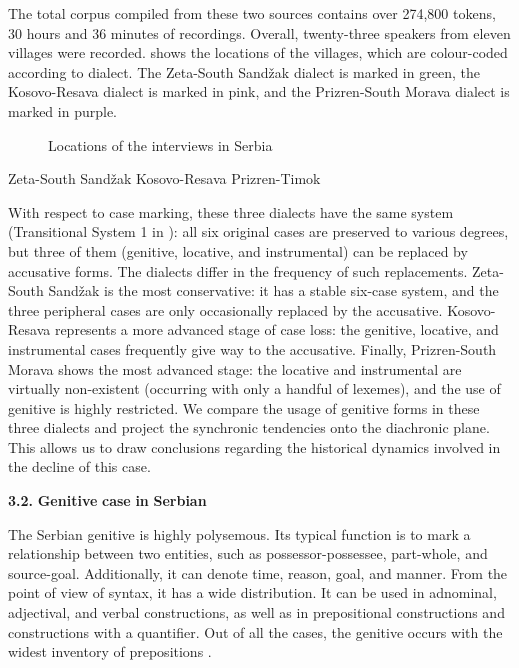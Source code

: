 \documentclass[output=paper]{langscibook}
\begin{document}
The total corpus compiled from these two sources contains over 274,800 tokens, 30 hours and 36 minutes of recordings. Overall, twenty-three speakers from eleven villages were recorded.  shows the locations of the villages, which are colour-coded according to dialect. The Zeta-South Sandžak dialect is marked in green, the Kosovo-Resava dialect is marked in pink, and the Prizren-South Morava dialect is marked in purple.

   
 

\begin{figure}
\caption{Locations of the interviews in Serbia}
\label{fig:key:1}
\end{figure}

      Zeta-South Sandžak  Kosovo{}-Resava  Prizren-Timok

With respect to case marking, these three dialects have the same system (Transitional System 1 in ): all six original cases are preserved to various degrees, but three of them (genitive, locative, and instrumental) can be replaced by accusative forms. The dialects differ in the frequency of such replacements. Zeta-South Sandžak is the most conservative: it has a stable six-case system, and the three peripheral cases are only occasionally replaced by the accusative. Kosovo-Resava represents a more advanced stage of case loss: the genitive, locative, and instrumental cases frequently give way to the accusative. Finally, Prizren-South Morava shows the most advanced stage: the locative and instrumental are virtually non-existent (occurring with only a handful of lexemes), and the use of genitive is highly restricted. We compare the usage of genitive forms in these three dialects and project the synchronic tendencies onto the diachronic plane. This allows us to draw conclusions regarding the historical dynamics involved in the decline of this case.

\textbf{3.2.} \textbf{Genitive} \textbf{case} \textbf{in} \textbf{Serbian}

The Serbian genitive is highly polysemous. Its typical function is to mark a relationship between two entities, such as possessor-possessee, part-whole, and source-goal. Additionally, it can denote time, reason, goal, and manner. From the point of view of syntax, it has a wide distribution. It can be used in adnominal, adjectival, and verbal constructions, as well as in prepositional constructions and constructions with a quantifier. Out of all the cases, the genitive occurs with the widest inventory of prepositions \citep{Feleško1955}.
\end{document}
